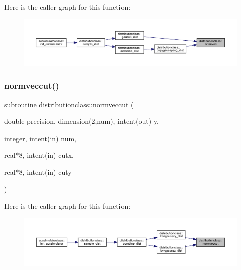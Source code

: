 Here is the caller graph for this function\+:\nopagebreak
\begin{figure}[H]
\begin{center}
\leavevmode
\includegraphics[width=350pt]{namespacedistributionclass_acfc04ca0c8be3e0f3e73779c5e88693b_icgraph}
\end{center}
\end{figure}
\mbox{\label{namespacedistributionclass_ae604d1dc6d7f92f0c37e00fb504d38fa}} 
\subsubsection{\texorpdfstring{normveccut()}{normveccut()}}
{\footnotesize\ttfamily subroutine distributionclass\+::normveccut (\begin{DoxyParamCaption}\item[{double precision, dimension(2,num), intent(out)}]{y,  }\item[{integer, intent(in)}]{num,  }\item[{real$\ast$8, intent(in)}]{cutx,  }\item[{real$\ast$8, intent(in)}]{cuty }\end{DoxyParamCaption})}

Here is the caller graph for this function\+:\nopagebreak
\begin{figure}[H]
\begin{center}
\leavevmode
\includegraphics[width=350pt]{namespacedistributionclass_ae604d1dc6d7f92f0c37e00fb504d38fa_icgraph}
\end{center}
\end{figure}
\mbox{\label{namespacedistributionclass_a714922ece09780473330b901fa566f71}} 
